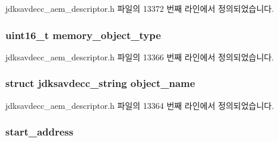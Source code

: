 jdksavdecc\+\_\+aem\+\_\+descriptor.\+h 파일의 13372 번째 라인에서 정의되었습니다.

\subsubsection[{\texorpdfstring{memory\+\_\+object\+\_\+type}{memory_object_type}}]{\setlength{\rightskip}{0pt plus 5cm}uint16\+\_\+t memory\+\_\+object\+\_\+type}\hypertarget{structjdksavdecc__descriptor__memory__object_a836ed1042ae19b71bdb4c8d8822c39e8}{}\label{structjdksavdecc__descriptor__memory__object_a836ed1042ae19b71bdb4c8d8822c39e8}


jdksavdecc\+\_\+aem\+\_\+descriptor.\+h 파일의 13366 번째 라인에서 정의되었습니다.

\subsubsection[{\texorpdfstring{object\+\_\+name}{object_name}}]{\setlength{\rightskip}{0pt plus 5cm}struct {\bf jdksavdecc\+\_\+string} object\+\_\+name}\hypertarget{structjdksavdecc__descriptor__memory__object_a7d1f5945a13863b1762fc6db74fa8f80}{}\label{structjdksavdecc__descriptor__memory__object_a7d1f5945a13863b1762fc6db74fa8f80}


jdksavdecc\+\_\+aem\+\_\+descriptor.\+h 파일의 13364 번째 라인에서 정의되었습니다.

\subsubsection[{\texorpdfstring{start\+\_\+address}{start_address}}]{ start\+\_\+address}\hypertarget{structjdksavdecc__descriptor__memory__object_a435fb25eb186ac591e661f3f1253de25}{}\label{structjdksavdecc__descriptor__memory__object_a435fb25eb186ac591e661f3f1253de25}


